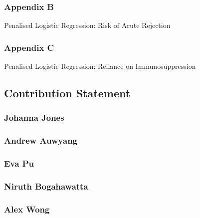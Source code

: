 \documentclass[a4paper,9pt,twocolumn,twoside,]{pinp}
\begin{document}
\hypertarget{appendix-b}{%
\subsubsection{Appendix B}\label{appendix-b}}

Penalised Logistic Regression: Risk of Acute Rejection

\hypertarget{appendix-c}{%
\subsubsection{Appendix C}\label{appendix-c}}

Penalised Logistic Regression: Reliance on Immunosuppression

\hypertarget{contribution-statement}{%
\subsection{Contribution Statement}\label{contribution-statement}}

\hypertarget{johanna-jones}{%
\subsubsection{Johanna Jones}\label{johanna-jones}}

\hypertarget{andrew-auwyang}{%
\subsubsection{Andrew Auwyang}\label{andrew-auwyang}}

\hypertarget{eva-pu}{%
\subsubsection{Eva Pu}\label{eva-pu}}

\hypertarget{niruth-bogahawatta}{%
\subsubsection{Niruth Bogahawatta}\label{niruth-bogahawatta}}

\hypertarget{alex-wong}{%
\subsubsection{Alex Wong}\label{alex-wong}}





\end{document}
